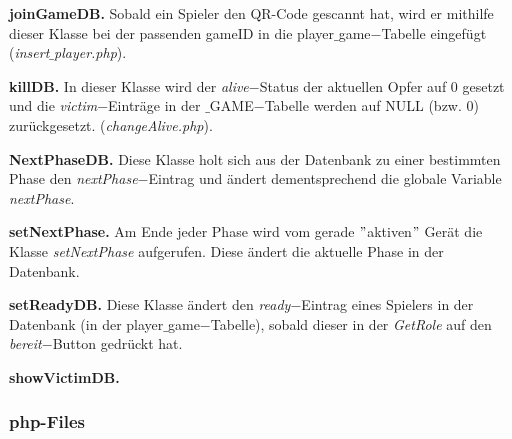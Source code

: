 \documentclass[12pt, a4paper]{article}
\begin{document}
\textbf{joinGameDB.}
Sobald ein Spieler den QR-Code gescannt hat, wird er mithilfe dieser Klasse bei der passenden gameID in die player$\_$game$-$Tabelle eingefügt (\textit{insert}$\_$\textit{player.php}).

\vspace{0,3 cm}

\textbf{killDB.}
In dieser Klasse wird der \textit{alive}$-$Status der aktuellen Opfer auf 0 gesetzt und die \textit{victim}$-$Einträge in der $\_$GAME$-$Tabelle werden auf NULL (bzw. 0) zurückgesetzt. (\textit{changeAlive.php}).

\vspace{0,3 cm}
	
\textbf{NextPhaseDB.}
Diese Klasse holt sich aus der Datenbank zu einer bestimmten Phase den \textit{nextPhase}$-$Eintrag und ändert dementsprechend die globale Variable \textit{nextPhase}.

\vspace{0,3 cm}

\textbf{setNextPhase.}
Am Ende jeder Phase wird vom gerade $"$aktiven$"$ Gerät die Klasse \textit{setNextPhase} aufgerufen. Diese ändert die aktuelle Phase in der Datenbank.

\vspace{0,3 cm}

\textbf{setReadyDB.}
Diese Klasse ändert den \textit{ready}$-$Eintrag eines Spielers in der Datenbank (in der player$\_$game$-$Tabelle), sobald dieser in der \textit{GetRole} auf den \textit{bereit}$-$Button gedrückt hat.
	
\vspace{0,3 cm}	
	
\textbf{showVictimDB.}


		\subsubsection{php-Files}
		
\end{document}
